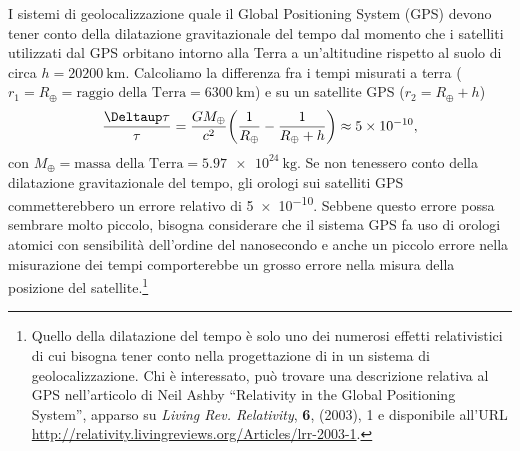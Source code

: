 I sistemi di geolocalizzazione quale il Global Positioning System (GPS) devono
tener conto della dilatazione gravitazionale del tempo dal momento che i
satelliti utilizzati dal GPS orbitano intorno alla Terra a un'altitudine
rispetto al suolo di circa $h = \SI{20200}{\kilo\metre}$.  Calcoliamo la
differenza fra i tempi misurati a terra
($r_{1} = R_{\oplus} = \text{raggio della Terra} = \SI{6300}{\kilo\metre}$) e su
un satellite GPS ($r_{2} = R_{\oplus} + h$)
\begin{equation}
  \frac{\var \tau}{\tau} = \frac{GM_{\oplus}}{c^{2}} \bigg(\frac{1}{R_{\oplus}}
  - \frac{1}{R_{\oplus} + h}\bigg) \approx \num{5e-10},
\end{equation}
con $M_{\oplus} = \text{massa della Terra} = \SI{5.97e24}{\kilo\gram}$.  Se non
tenessero conto della dilatazione gravitazionale del tempo, gli orologi sui
satelliti GPS commetterebbero un errore relativo di \num{5e-10}.  Sebbene questo
errore possa sembrare molto piccolo, bisogna considerare che il sistema GPS fa
uso di orologi atomici con sensibilità dell'ordine del nanosecondo e anche un
piccolo errore nella misurazione dei tempi comporterebbe un grosso errore nella
misura della posizione del
satellite.\footnote{Quello della dilatazione del tempo è solo uno dei numerosi
  effetti relativistici di cui bisogna tener conto nella progettazione di in un
  sistema di geolocalizzazione.  Chi è interessato, può trovare una descrizione
  relativa al GPS nell'articolo di Neil Ashby ``Relativity in the Global
  Positioning System'', apparso su \emph{Living Rev. Relativity}, \textbf{6},
  (2003), 1 e disponibile all'URL
  \url{http://relativity.livingreviews.org/Articles/lrr-2003-1}.}

